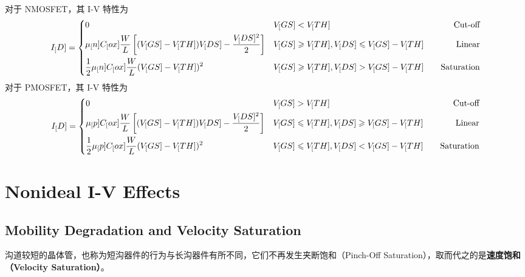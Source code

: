 对于 NMOSFET，其 I-V 特性为
\begin{equation}
    I_[D] = 
    \begin{dcases}  %
        \begin{aligned}
            & 0 && V_[GS] < V_[TH] &&& \text{Cut-off} \\
            & \mu_[n] C_[ox] \frac{W}{L} \left[ (V_[GS] - V_[TH]) V_[DS] - \frac{V_[DS]^2}{2} \right] && V_[GS] \geqslant V_[TH], V_[DS] \leqslant V_[GS] - V_[TH] &&& \text{Linear} \\
            & \frac{1}{2} \mu_[n] C_[ox] \frac{W}{L} (V_[GS] - V_[TH])^2 && V_[GS] \geqslant V_[TH], V_[DS] > V_[GS] - V_[TH] &&& \text{Saturation}
        \end{aligned}
    \end{dcases}
\end{equation}
对于 PMOSFET，其 I-V 特性为
\begin{equation}
    I_[D] = 
    \begin{dcases}  %
        \begin{aligned}
            & 0 && V_[GS] > V_[TH] &&& \text{Cut-off} \\
            & \mu_[p] C_[ox] \frac{W}{L} \left[ (V_[GS] - V_[TH]) V_[DS] - \frac{V_[DS]^2}{2} \right] && V_[GS] \leqslant V_[TH], V_[DS] \geqslant V_[GS] - V_[TH] &&& \text{Linear} \\
            & \frac{1}{2} \mu_[p] C_[ox] \frac{W}{L} (V_[GS] - V_[TH])^2 && V_[GS] \leqslant V_[TH], V_[DS] < V_[GS] - V_[TH] &&& \text{Saturation}
        \end{aligned}
    \end{dcases}
\end{equation}

\section{Nonideal I-V Effects}

\subsection{Mobility Degradation and Velocity Saturation}

沟道较短的晶体管，也称为短沟器件的行为与长沟器件有所不同，它们不再发生夹断饱和（Pinch-Off Saturation），取而代之的是\textbf{速度饱和（Velocity Saturation）}。


